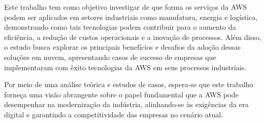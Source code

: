 \documentclass[
	12pt,				%
	openright,			%
	twoside,			%
	a4paper,			%
	english,			%
	french,				%
	spanish,			%
	brazil,				%
	]{abntex2}
\begin{document}
Este trabalho tem como objetivo investigar de que forma os serviços da AWS podem ser aplicados em setores industriais como manufatura, energia e logística, demonstrando como tais tecnologias podem contribuir para o aumento da eficiência, a redução de custos operacionais e a inovação de processos. Além disso, o estudo busca explorar os principais benefícios e desafios da adoção dessas soluções em nuvem, apresentando casos de sucesso de empresas que implementaram com êxito tecnologias da AWS em seus processos industriais.

Por meio de uma análise teórica e estudos de casos, espera-se que este trabalho forneça uma visão abrangente sobre o papel fundamental que a AWS pode desempenhar na modernização da indústria, alinhando-se às exigências da era digital e garantindo a competitividade das empresas no cenário atual.


\printindex
\end{document}
